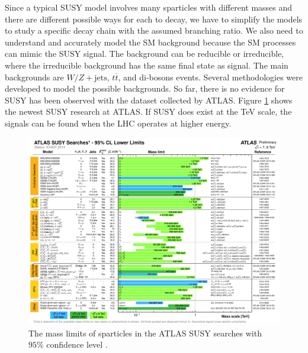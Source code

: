 \documentclass[12pt]{report}
\begin{document}
Since a typical SUSY model involves many sparticles with different masses and there are different possible ways for each to decay, we have to simplify the models to study a specific decay chain with the assumed branching ratio.
We also need to understand and accurately model the SM background because the SM processes can mimic the SUSY signal.
The background can be reducible or irreducible, where the irreducible background has the same final state as signal.
The main backgrounds are $W/Z + \mathrm{jets}$, $t \overline{t}$, and di-bosons events.
Several methodologies were developed to model the possible backgrounds.
So far, there is no evidence for SUSY has been observed with the dataset collected by ATLAS.
Figure \ref{fig: ATLAS_SUSY_Summary} shows the newest SUSY research at ATLAS.
If SUSY does exist at the TeV scale, the signals can be found when the LHC operates at higher energy.
\begin{figure}[htbp]
\begin{center}
\includegraphics[scale=0.8, angle=90]{figures/ATLAS_SUSY_Summary.pdf}
\caption{The mass limits of sparticles in the ATLAS SUSY searches with $95\%$ confidence level \cite{atlas_results}.} %
\label{fig: ATLAS_SUSY_Summary}
\end{center}
\end{figure}
\end{document}
